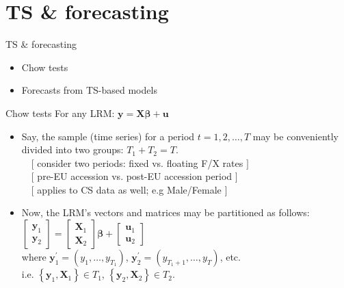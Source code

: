 \documentclass{beamer}
\begin{document}
\section{TS \& forecasting}
\begin{frame}{TS \& forecasting}
\begin{itemize}
    \item Chow tests
    \bigskip
    \item Forecasts from TS-based models
\end{itemize}
\end{frame}
\begin{frame}{Chow tests}
For any LRM: $\bm{y} = \bm{X\beta}+\bm{u}$\\
\vspace{0.3cm}
\begin{itemize}
\item Say, the sample (time series) for a period $t=1,2, \dots, T$ may be conveniently divided into two groups: $T_1 + T_2 = T$.  \\ 
~~$[$ consider two periods: fixed vs. floating F/X rates $]$ \\ 
~~$[$ pre-EU accession vs. post-EU accession period $]$ \\
~~$[$ applies to CS data as well; e.g Male/Female $]$
\vspace{0.3cm}
\item Now, the LRM's vectors and matrices may be partitioned as follows: \\
\vspace{0.3cm}
$ \begin{bmatrix} \bm{y}_1 \\ \bm{y}_2 \end{bmatrix} = 
\begin{bmatrix} \bm{X}_1 \\ \bm{X}_2 \end{bmatrix} \bm{\beta} +
\begin{bmatrix} \bm{u}_1 \\ \bm{u}_2 \end{bmatrix}$ \\
\vspace{0.2cm}
where $\bm{y}_1^\prime = (y_1, \dots , y_{T_1})$, 
$\bm{y}_2^\prime = (y_{T_1+1}, \dots , y_{T})$, etc. 
\\ i.e. $\left\lbrace\bm{y}_1, \bm{X}_1 \right\rbrace \in T_1$,  
$\left\lbrace\bm{y}_2, \bm{X}_2 \right\rbrace \in T_2$. 
\end{itemize}
\end{frame}
\end{document}
